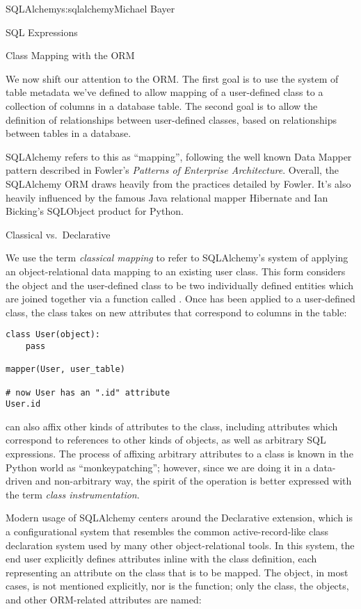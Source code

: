 \begin{aosachapter}{SQLAlchemy}{s:sqlalchemy}{Michael Bayer}
\begin{aosasect1}{SQL Expressions}
\end{aosasect1}

\begin{aosasect1}{Class Mapping with the ORM}

We now shift our attention to the ORM.   The first goal is to use the system of table metadata we've defined
to allow mapping of a user-defined class to a collection of columns in a database table.   The second goal is to allow
the definition of relationships between user-defined classes, based on relationships between tables in a database.

SQLAlchemy refers to this as ``mapping'', following the well known Data Mapper pattern described
in Fowler's \emph{Patterns of Enterprise Architecture}.   Overall, the SQLAlchemy ORM draws heavily
from the practices detailed by Fowler.  It's also heavily influenced by the famous Java
relational mapper Hibernate and Ian Bicking's SQLObject product for Python.

\begin{aosasect2}{Classical vs.\ Declarative}

We use the term \emph{classical mapping} to refer to SQLAlchemy's system of
applying an object-relational data mapping to an existing user class. This
form considers the  object and the user-defined class to be two
individually defined entities which are joined together via a function called
. Once  has been applied to a user-defined class, the
class takes on new attributes that correspond to columns in the table:

\begin{verbatim}
class User(object):
    pass

mapper(User, user_table)

# now User has an ".id" attribute
User.id
\end{verbatim}

\noindent {} can also affix other kinds of attributes to the class, including
attributes which correspond to references to other kinds of objects, as well
as arbitrary SQL expressions.  The process of affixing arbitrary attributes to
a class is known in the Python world as ``monkeypatching''; however, since we are
doing it in a data-driven and non-arbitrary way, the spirit of the operation is
better expressed with the term \emph{class instrumentation}.

Modern usage of SQLAlchemy centers around the Declarative extension,
which is a configurational system that resembles the common
active-record-like class declaration system used by many other
object-relational tools. In this system, the end user explicitly defines
attributes inline with the class definition, each representing an attribute on
the class that is to be mapped. The  object, in most cases, is not
mentioned explicitly, nor is the  function; only the class, the
 objects, and other ORM-related attributes are named:


\end{aosasect2}
\end{aosasect1}
\end{aosachapter}
